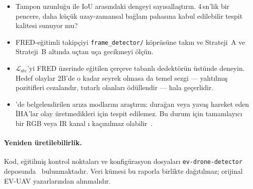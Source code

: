 \documentclass[11pt,a4paper]{article}
\begin{document}
\begin{itemize}
\setlength\itemsep{0.2em}
  \item Tampon uzunlu\u{g}u ile IoU aras{\i}ndaki dengeyi say{\i}salla\c{s}t{\i}r{\i}n.
        4\,sn'lik bir pencere, daha k\"u\c{c}\"uk uzay-zamansal
        ba\u{g}lam pahas{\i}na kabul edilebilir tespit kalitesi
        sunuyor mu?
  \item FRED-e\u{g}itimli takip\c{c}iyi
        \texttt{frame\_detector/} k\"opr\"us\"une tak{\i}n ve
        Strateji~A ve Strateji~B alt{\i}nda u\c{c}tan u\c{c}a
        gecikmeyi \"ol\c{c}\"un.
  \item $\mathcal{L}_\text{stc}$'yi FRED \"uzerinde e\u{g}itilen
        \c{c}er\c{c}eve tabanl{\i} dedekt\"or\"un \"ust\"unde
        deneyin. Hedef olaylar 2B'de o kadar seyrek olmasa da
        temel sezgi --- yal{\i}t{\i}lm{\i}\c{s} pozitifleri cezaland{\i}r,
        tutarl{\i} olanlar{\i} \"od\"ullendir --- hala ge\c{c}erlidir.
  \item \cite[B\"ol.~6]{chen2025evspsegnet}'de belgelendirilen
        ar{\i}za modlar{\i}n{\i} ara\c{s}t{\i}r{\i}n: dura\u{g}an
        veya yava\c{s} hareket eden \.{I}HA'lar olay \"uretmedikleri
        i\c{c}in tespit edilemez. Bu durum i\c{c}in tamamlay{\i}c{\i}
        bir RGB veya IR kanal\hskip0pt {\i} ka\c{c}{\i}n{\i}lmaz
        olabilir~\cite{magrini2024nerdd,magrini2025fred}.
\end{itemize}

\paragraph{Yeniden \"uretilebilirlik.}
Kod, e\u{g}itilmi\c{s} kontrol noktalar{\i} ve konfig\"urasyon
dosyalar{\i} \texttt{ev-drone-detector}
deposunda~\cite{evdronedetector2026} bulunmaktad{\i}r. Veri k\"umesi
bu raporla birlikte da\u{g}{\i}t{\i}lmaz; orijinal EV-UAV
yazarlar{\i}ndan al{\i}nmal{\i}d{\i}r.



\end{document}
